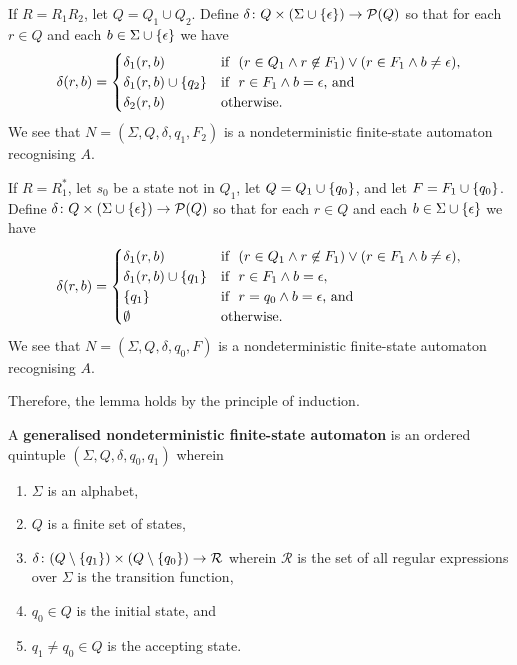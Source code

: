     If \(R = R_1 R_2\), let \(Q = Q_1 \cup Q_2\). Define \(\delta\colon Q \times
    (\Sigma \cup \{\epsilon\})\to\mathcal{P}(Q)\) so that for each \(r \in Q\) and
    each \(b \in \Sigma \cup \{\epsilon\}\) we have
    \[
        \delta(r, b) = \begin{cases}
            \delta_1(r, b) & \text{if }\ (r \in Q_1 \land r \not\in F_1) \lor (r
            \in F_1 \land b \neq \epsilon),\\
            \delta_1(r, b) \cup \{q_2\} & \text{if }\ r \in F_1 \land b =
            \epsilon \text{, and}\\
            \delta_2(r, b) & \text{otherwise.}
        \end{cases}
    \]
    We see that \(N = (\Sigma, Q, \delta, q_1, F_2)\) is a nondeterministic
    finite-state automaton recognising \(A\).

    If \(R = R_1^*\), let \(s_0\) be a state not in \(Q_1\), let \(Q = Q_1 \cup
    \{q_0\}\), and let \(F = F_1 \cup \{q_0\}\). Define \(\delta\colon Q
    \times (\Sigma \cup \{\epsilon\})\to\mathcal{P}(Q)\) so that for each \(r \in Q\)
    and each \(b \in \Sigma \cup \{\epsilon\}\) we have
    \[
        \delta(r, b) = \begin{cases}
            \delta_1(r, b) & \text{if }\ (r \in Q_1 \land r \not\in F_1) \lor (r
            \in F_1 \land b \neq \epsilon),\\
            \delta_1(r, b) \cup \{q_1\} & \text{if }\ r \in F_1 \land b =
            \epsilon,\\
            \{q_1\} & \text{if }\ r = q_0 \land b = \epsilon \text{, and}\\
            \emptyset & \text{otherwise.}
        \end{cases}
    \]
    We see that \(N = (\Sigma, Q, \delta, q_0, F)\) is a nondeterministic
    finite-state automaton recognising \(A\).

    Therefore, the lemma holds by the principle of induction.
\Epr

\Bdf
    A {\bf generalised nondeterministic finite-state automaton} is an ordered
    quintuple \((\Sigma, Q, \delta, q_0, q_1)\) wherein
    \begin{enumerate}
        \item \(\Sigma\) is an alphabet,
        \item \(Q\) is a finite set of states,
        \item \(\delta\colon(Q \setminus \{q_1\}) \times (Q \setminus
        \{q_0\})\to\mathcal{R}\) wherein \(\mathcal{R}\) is the set of all
        regular expressions over \(\Sigma\) is the transition function,
        \item \(q_0 \in Q\) is the initial state, and
        \item \(q_1 \neq q_0 \in Q\) is the accepting state.
    \end{enumerate}
\Edf

